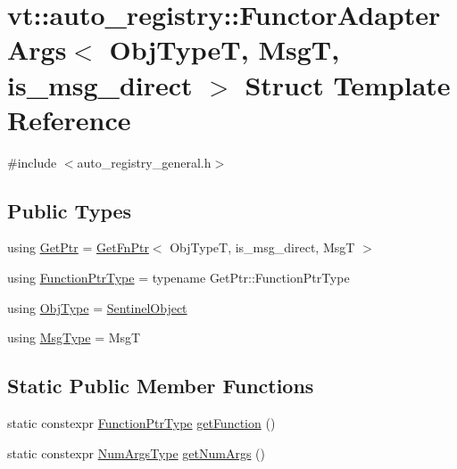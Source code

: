 \hypertarget{structvt_1_1auto__registry_1_1_functor_adapter_args}{}\section{vt\+:\+:auto\+\_\+registry\+:\+:Functor\+Adapter\+Args$<$ Obj\+TypeT, MsgT, is\+\_\+msg\+\_\+direct $>$ Struct Template Reference}
\label{structvt_1_1auto__registry_1_1_functor_adapter_args}


{\ttfamily \#include $<$auto\+\_\+registry\+\_\+general.\+h$>$}

\subsection*{Public Types}
\begin{DoxyCompactItemize}
\item 
using \hyperlink{structvt_1_1auto__registry_1_1_functor_adapter_args_ae3d4f4165ebb4b537238562514246677}{Get\+Ptr} = \hyperlink{structvt_1_1auto__registry_1_1_get_fn_ptr}{Get\+Fn\+Ptr}$<$ Obj\+TypeT, is\+\_\+msg\+\_\+direct, MsgT $>$
\item 
using \hyperlink{structvt_1_1auto__registry_1_1_functor_adapter_args_ae2dba60ea2070d1b36d63bd466abf80e}{Function\+Ptr\+Type} = typename Get\+Ptr\+::\+Function\+Ptr\+Type
\item 
using \hyperlink{structvt_1_1auto__registry_1_1_functor_adapter_args_aaa962c3c91d6a760716bb347c304c949}{Obj\+Type} = \hyperlink{structvt_1_1auto__registry_1_1_sentinel_object}{Sentinel\+Object}
\item 
using \hyperlink{structvt_1_1auto__registry_1_1_functor_adapter_args_accea6f5de9ad939e483849a111e17d53}{Msg\+Type} = MsgT
\end{DoxyCompactItemize}
\subsection*{Static Public Member Functions}
\begin{DoxyCompactItemize}
\item 
static constexpr \hyperlink{structvt_1_1auto__registry_1_1_functor_adapter_args_ae2dba60ea2070d1b36d63bd466abf80e}{Function\+Ptr\+Type} \hyperlink{structvt_1_1auto__registry_1_1_functor_adapter_args_abb4e114fa74e649cbdd464291954e5ab}{get\+Function} ()
\item 
static constexpr \hyperlink{namespacevt_1_1auto__registry_aebda1d9d765bc9147dc654ad0712c936}{Num\+Args\+Type} \hyperlink{structvt_1_1auto__registry_1_1_functor_adapter_args_a41a398d3493eded9ccf9d19013d6e331}{get\+Num\+Args} ()
\end{DoxyCompactItemize}


